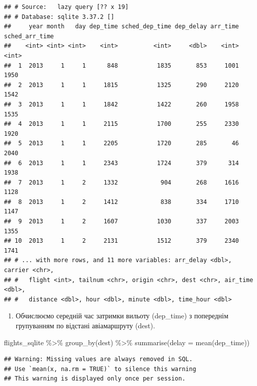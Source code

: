 \documentclass[
]{book}
\newenvironment{Shaded}{\begin{snugshade}}{\end{snugshade}}
\newcommand{\AttributeTok}[1]{\textcolor[rgb]{0.77,0.63,0.00}{#1}}
\newcommand{\FunctionTok}[1]{\textcolor[rgb]{0.00,0.00,0.00}{#1}}
\newcommand{\NormalTok}[1]{#1}
\newcommand{\SpecialCharTok}[1]{\textcolor[rgb]{0.00,0.00,0.00}{#1}}
\providecommand{\tightlist}{%
  \setlength{\itemsep}{0pt}\setlength{\parskip}{0pt}}
\begin{document}
\begin{verbatim}
## # Source:   lazy query [?? x 19]
## # Database: sqlite 3.37.2 []
##     year month   day dep_time sched_dep_time dep_delay arr_time sched_arr_time
##    <int> <int> <int>    <int>          <int>     <dbl>    <int>          <int>
##  1  2013     1     1      848           1835       853     1001           1950
##  2  2013     1     1     1815           1325       290     2120           1542
##  3  2013     1     1     1842           1422       260     1958           1535
##  4  2013     1     1     2115           1700       255     2330           1920
##  5  2013     1     1     2205           1720       285       46           2040
##  6  2013     1     1     2343           1724       379      314           1938
##  7  2013     1     2     1332            904       268     1616           1128
##  8  2013     1     2     1412            838       334     1710           1147
##  9  2013     1     2     1607           1030       337     2003           1355
## 10  2013     1     2     2131           1512       379     2340           1741
## # ... with more rows, and 11 more variables: arr_delay <dbl>, carrier <chr>,
## #   flight <int>, tailnum <chr>, origin <chr>, dest <chr>, air_time <dbl>,
## #   distance <dbl>, hour <dbl>, minute <dbl>, time_hour <dbl>
\end{verbatim}

\begin{enumerate}
\def\labelenumi{\arabic{enumi}.}
\setcounter{enumi}{4}
\tightlist
\item
  Обчислюємо середній час затримки вильоту (dep\_time) з попереднім групуванням по відстані авіамаршруту (dest).
\end{enumerate}

\begin{Shaded}
\begin{Highlighting}[]
\NormalTok{flights\_sqlite }\SpecialCharTok{\%\textgreater{}\%} 
  \FunctionTok{group\_by}\NormalTok{(dest) }\SpecialCharTok{\%\textgreater{}\%}
  \FunctionTok{summarise}\NormalTok{(}\AttributeTok{delay =} \FunctionTok{mean}\NormalTok{(dep\_time))}
\end{Highlighting}
\end{Shaded}

\begin{verbatim}
## Warning: Missing values are always removed in SQL.
## Use `mean(x, na.rm = TRUE)` to silence this warning
## This warning is displayed only once per session.
\end{verbatim}
\end{document}

